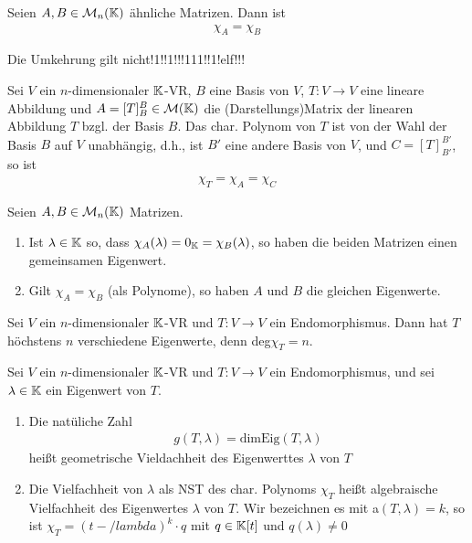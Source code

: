 \begin{theorem}
Seien $A,B\in\mathcal{M}_n(\mathbb{K})$ ähnliche Matrizen. Dann ist
\begin{align*}
    \chi_A=\chi_B
\end{align*}
\end{theorem}

\begin{remark}
Die Umkehrung gilt nicht!1!!1!!!111!!1!elf!!!
\end{remark}

\begin{corollary}
Sei $V$ ein $n$-dimensionaler $\mathbb{K}$-VR, $B$ eine Basis von $V$, $T:V\to V$ eine lineare Abbildung und $A=[T]_B^B\in\mathcal{M}(\mathbb{K})$ die (Darstellungs)Matrix der linearen Abbildung $T$ bzgl. der Basis $B$.
Das char. Polynom von $T$ ist von der Wahl der Basis $B$ auf $V$ unabhängig, d.h., ist $B'$ eine andere Basis von $V$, und 
$C=[T]_{B'}^{B'}$, so ist 
\begin{align*}
    \chi_T=\chi_A=\chi_C
\end{align*}
\end{corollary}

\begin{remark}
Seien $A,B\in \mathcal{M}_n(\mathbb{K})$ Matrizen.
\begin{enumerate}
    \item Ist $\lambda\in\mathbb{K}$ so, dass $\chi_A(\lambda)=0_{\mathbb{K}}=\chi_B(\lambda)$, so haben die beiden Matrizen einen gemeinsamen Eigenwert.
    \item Gilt $\chi_A=\chi_B$ (als Polynome), so haben $A$ und $B$ die gleichen Eigenwerte.
\end{enumerate}
\end{remark}

\begin{corollary}
Sei $V$ ein $n$-dimensionaler $\mathbb{K}$-VR und $T:V\to V$ ein Endomorphismus. Dann hat $T$ höchstens $n$ verschiedene Eigenwerte, denn deg$\chi_T=n$.
\end{corollary}

\begin{definition}
Sei $V$ ein $n$-dimensionaler $\mathbb{K}$-VR und $T:V\to V$ ein Endomorphismus, und sei $\lambda\in\mathbb{K}$ ein Eigenwert von $T$.
\begin{enumerate}
    \item Die natüliche Zahl
    \begin{align*}
        g(T,\lambda)=\text{dimEig}(T,\lambda)
    \end{align*}
    heißt geometrische Vieldachheit des Eigenwerttes $\lambda$ von $T$
    \item Die Vielfachheit von $\lambda$ als NST des char. Polynoms $\chi_T$ heißt algebraische Vielfachheit des Eigenwertes $\lambda$ von $T$. Wir bezeichnen es mit a$(T,\lambda)=k$, so ist $\chi_T=(t-/lambda)^k\cdot q$ mit $q\in\mathbb{K}[t]$ und $q(\lambda)\neq0$
\end{enumerate}
\end{definition}

